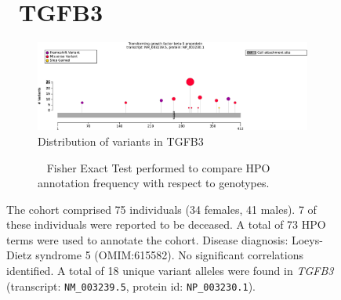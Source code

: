 \begin{figure}[htbp]
\section*{ TGFB3}
\centering
\begin{subfigure}[b]{0.95\textwidth}
\centering
\includegraphics[width=\textwidth]{ img/TGFB3_protein_diagram.pdf} 
\captionsetup{justification=raggedright,singlelinecheck=false}
\caption{Distribution of variants in TGFB3}
\end{subfigure}

\vspace{2em}

\begin{subfigure}[b]{0.95\textwidth}
\centering
{}
\captionsetup{justification=raggedright,singlelinecheck=false}
\caption{             Fisher Exact Test performed to compare HPO annotation frequency with respect to genotypes. }
\end{subfigure}

\vspace{2em}

\caption{ The cohort comprised 75 individuals (34 females, 41 males). 7 of these individuals were reported to be deceased. A total of 73 HPO terms were used to annotate the cohort. Disease diagnosis: Loeys-Dietz syndrome 5 (OMIM:615582). No significant correlations identified. A total of 18 unique variant alleles were found in \textit{TGFB3} (transcript: \texttt{NM\_003239.5}, protein id: \texttt{NP\_003230.1}).}
\end{figure}

